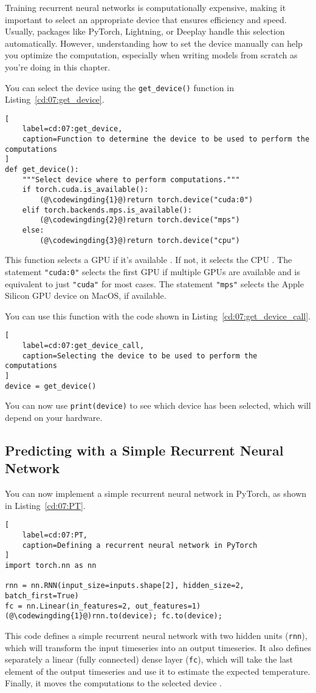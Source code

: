 Training recurrent neural networks is computationally expensive, making it important to select an appropriate device that ensures efficiency and speed. Usually, packages like PyTorch, Lightning, or Deeplay handle this selection automatically. 
However, understanding how to set the device manually can help you optimize the computation, especially when writing models from scratch as you're doing in this chapter.

You can select the device using the \lstinline{get_device()} function in Listing~\ref{cd:07:get_device}.
\begin{lstlisting}[
    label=cd:07:get_device,
    caption=Function to determine the device to be used to perform the computations
]
def get_device():
    """Select device where to perform computations."""
    if torch.cuda.is_available():
        (@\codewingding{1}@)return torch.device("cuda:0")
    elif torch.backends.mps.is_available():
        (@\codewingding{2}@)return torch.device("mps")
    else:
        (@\codewingding{3}@)return torch.device("cpu")
\end{lstlisting}
This function selects a GPU if it's available . If not, it selects the CPU .
The statement \lstinline{"cuda:0"} selects the first GPU if multiple GPUs are available and is equivalent to just \lstinline{"cuda"} for most cases.
The statement \lstinline{"mps"} selects the Apple Silicon GPU device on MacOS, if available.

You can use this function with the code shown in Listing~\ref{cd:07:get_device_call}.
\begin{lstlisting}[
    label=cd:07:get_device_call,
    caption=Selecting the device to be used to perform the computations
]
device = get_device()
\end{lstlisting}
You can now use \lstinline{print(device)} to see which device has been selected, which will depend on your hardware.

\subsection{Predicting with a Simple Recurrent Neural Network}

You can now implement a simple recurrent neural network in PyTorch, as shown in Listing~\ref{cd:07:PT}.
\begin{lstlisting}[
    label=cd:07:PT,
    caption=Defining a recurrent neural network in PyTorch
]
import torch.nn as nn

rnn = nn.RNN(input_size=inputs.shape[2], hidden_size=2, batch_first=True)
fc = nn.Linear(in_features=2, out_features=1)
(@\codewingding{1}@)rnn.to(device); fc.to(device);
\end{lstlisting}
This code defines a simple recurrent neural network with two hidden units (\lstinline{rnn}), which will transform the input timeseries into an output timeseries.
It also defines separately a linear (fully connected) dense layer (\lstinline{fc}), which will take the last element of the output timeseries and use it to estimate the expected temperature.
Finally, it moves the computations to the selected device .

